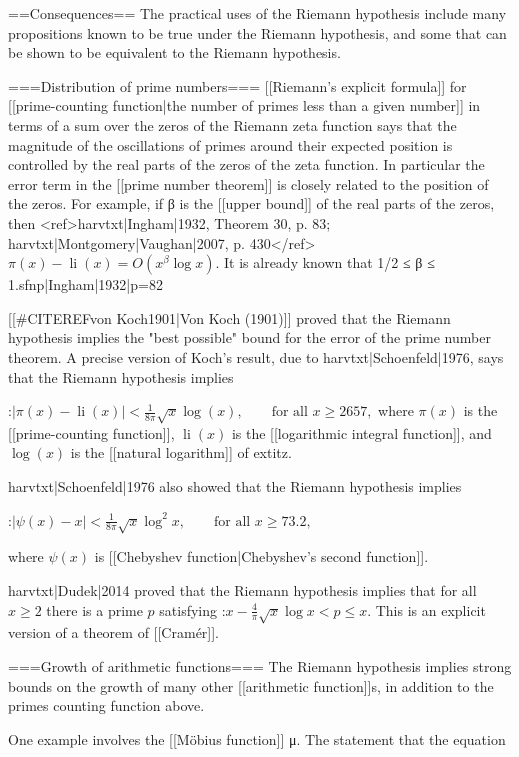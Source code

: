 \documentclass{article}
\begin{document}
==Consequences==
The practical uses of the Riemann hypothesis include many propositions known to be true under the Riemann hypothesis, and some that can be shown to be equivalent to the Riemann hypothesis.

===Distribution of prime numbers===
[[Riemann's explicit formula]] for [[prime-counting function|the number of primes less than a given number]] in terms of a sum over the zeros of the Riemann zeta function says that the magnitude of the oscillations of primes around their expected position is controlled by the real parts of the zeros of the zeta function. In particular the error term in the [[prime number theorem]] is closely related to the position of the zeros. For example, if β is the [[upper bound]] of the real parts of the zeros, then <ref>{{harvtxt|Ingham|1932}}, Theorem 30, p. 83; {{harvtxt|Montgomery|Vaughan|2007}}, p. 430</ref>
$\pi(x) - \operatorname{li}(x) = O \left( x^{\beta} \log x \right).$
It is already known that 1/2 ≤ β ≤ 1.{{sfnp|Ingham|1932|p=82}}

[[#CITEREFvon Koch1901|Von Koch (1901)]] proved that the Riemann hypothesis implies the "best possible" bound for the error of the prime number theorem. A precise version of Koch's result, due to {{harvtxt|Schoenfeld|1976}}, says that the Riemann hypothesis implies

:$|\pi(x) - \operatorname{li}(x)| < \frac{1}{8\pi} \sqrt{x} \log(x), \qquad \text{for all } x \ge 2657,$
where $\pi(x)$ is the [[prime-counting function]], $\operatorname{li}(x)$ is the [[logarithmic integral function]], and $\log(x)$ is the [[natural logarithm]] of 	extit{z}.

{{harvtxt|Schoenfeld|1976}} also showed that the Riemann hypothesis implies

:$|\psi(x) - x| < \frac{1}{8\pi} \sqrt{x} \log^2 x, \qquad \text{for all } x \ge 73.2, $

where $\psi(x)$ is [[Chebyshev function|Chebyshev's second function]].

{{harvtxt|Dudek|2014}} proved that the Riemann hypothesis implies that for all $x \geq 2$ there is a prime $p$ satisfying
:$x - \frac{4}{\pi} \sqrt{x} \log x < p \leq x$.
This is an explicit version of a theorem of [[Cramér]].

===Growth of arithmetic functions===
The Riemann hypothesis implies strong bounds on the growth of many other [[arithmetic function]]s, in addition to the primes counting function above.

One example involves the [[Möbius function]] μ. The statement that the equation
\end{document}

